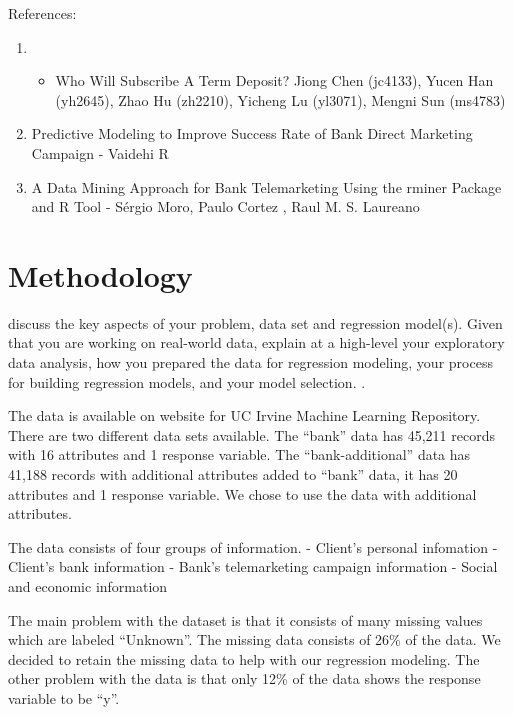 \documentclass[english,floatsintext,man]{apa6}
\begin{document}
References:

\begin{enumerate}
\def\labelenumi{(\arabic{enumi})}
\item
  \begin{itemize}
  \itemsep1pt\parskip0pt
  \item
    Who Will Subscribe A Term Deposit? Jiong Chen (jc4133), Yucen Han
    (yh2645), Zhao Hu (zh2210), Yicheng Lu (yl3071), Mengni Sun (ms4783)
  \end{itemize}
\item
  Predictive Modeling to Improve Success Rate of Bank Direct Marketing
  Campaign - Vaidehi R
\item
  A Data Mining Approach for Bank Telemarketing Using the rminer Package
  and R Tool - Sérgio Moro, Paulo Cortez , Raul M. S. Laureano
\end{enumerate}

\section{Methodology}\label{methodology}

discuss the key aspects of your problem, data set and regression
model(s). Given that you are working on real-world data, explain at a
high-level your exploratory data analysis, how you prepared the data for
regression modeling, your process for building regression models, and
your model selection. .

The data is available on website for UC Irvine Machine Learning
Repository. There are two different data sets available. The
\enquote{bank} data has 45,211 records with 16 attributes and 1 response
variable. The \enquote{bank-additional} data has 41,188 records with
additional attributes added to \enquote{bank} data, it has 20 attributes
and 1 response variable. We chose to use the data with additional
attributes.

The data consists of four groups of information. - Client's personal
infomation - Client's bank information - Bank's telemarketing campaign
information - Social and economic information

The main problem with the dataset is that it consists of many missing
values which are labeled \enquote{Unknown}. The missing data consists of
26\% of the data. We decided to retain the missing data to help with our
regression modeling. The other problem with the data is that only 12\%
of the data shows the response variable to be \enquote{y}.
\end{document}
